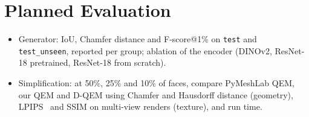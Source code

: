 \section{Planned Evaluation}
\begin{itemize}[leftmargin=*]
  \item Generator: IoU, Chamfer distance and F-score@1\% on \texttt{test} and \texttt{test\_unseen}, reported per group; ablation of the encoder (DINOv2, ResNet-18 pretrained, ResNet-18 from scratch).
  \item Simplification: at 50\%, 25\% and 10\% of faces, compare PyMeshLab QEM, our QEM and D-QEM using Chamfer and Hausdorff distance (geometry), LPIPS~\cite{zhang2018lpips} and SSIM on multi-view renders (texture), and run time.
\end{itemize}
